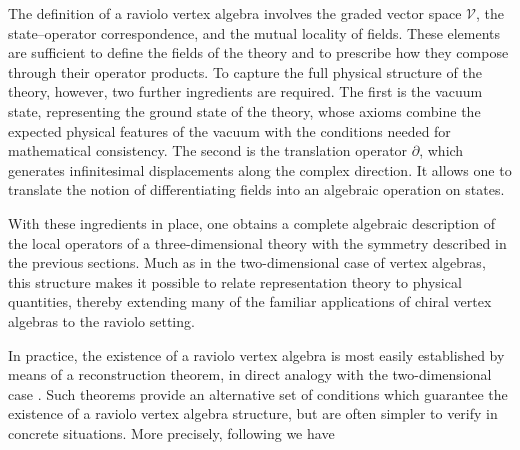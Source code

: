 \documentclass[11pt]{amsart}
\newcommand{\CV}{{\mathcal V}}
\numberwithin{equation}{section}
\numberwithin{figure}{section}
\numberwithin{table}{section}
\theoremstyle{thm}
\numberwithin{equation}{subsection}
\theoremstyle{definition}
\theoremstyle{rem}
\begin{document}
The definition of a raviolo vertex algebra involves the graded vector space $\CV$, the state–operator correspondence, and the mutual locality of fields. These elements are sufficient to define the fields of the theory and to prescribe how they compose through their operator products. To capture the full physical structure of the theory, however, two further ingredients are required. The first is the vacuum state, representing the ground state of the theory, whose axioms combine the expected physical features of the vacuum with the conditions needed for mathematical consistency. The second is the translation operator $\partial$, which generates infinitesimal displacements along the complex direction. It allows one to translate the notion of differentiating fields into an algebraic operation on states. 

With these ingredients in place, one obtains a complete algebraic description of the local operators 
of a three-dimensional theory with the symmetry described in the previous sections. 
Much as in the two-dimensional case of vertex algebras, this structure makes it possible to relate 
representation theory to physical quantities, thereby extending many of the familiar applications 
of chiral vertex algebras to the raviolo setting.

In practice, the existence of a raviolo vertex algebra is most easily established by means of a reconstruction theorem, in direct analogy with the two-dimensional case \cite{Frenkel:1994em}. Such theorems provide an alternative set of conditions which guarantee the existence of a raviolo vertex algebra structure, but are often simpler to verify in concrete situations. More precisely, following \cite{Garner:2023zqn} we have
\end{document}

